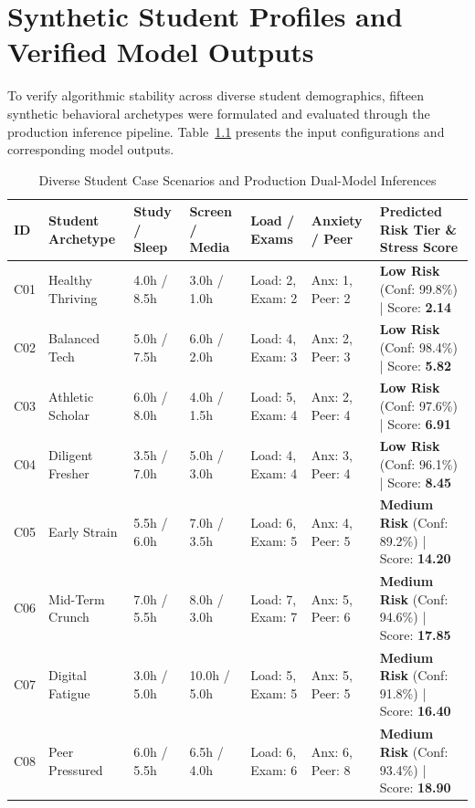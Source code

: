 \documentclass[12pt,a4paper,oneside]{report}
\begin{document}
\clearpage

\chapter{Synthetic Student Profiles and Verified Model Outputs}
\label{app:synthetic_cases}

To verify algorithmic stability across diverse student demographics, fifteen synthetic behavioral archetypes were formulated and evaluated through the production inference pipeline. Table~\ref{tab:synthetic_cases} presents the input configurations and corresponding model outputs.

\begin{table}[H]
\centering
\caption{Diverse Student Case Scenarios and Production Dual-Model Inferences}
\label{tab:synthetic_cases}
\scriptsize
\begin{tabularx}{\textwidth}{p{0.6cm}p{1.8cm}p{1.4cm}p{1.6cm}p{1.8cm}p{1.8cm}X}
\toprule
\textbf{ID} & \textbf{Student Archetype} & \textbf{Study / Sleep} & \textbf{Screen / Media} & \textbf{Load / Exams} & \textbf{Anxiety / Peer} & \textbf{Predicted Risk Tier \& Stress Score} \\
\midrule
C01 & Healthy Thriving & 4.0h / 8.5h & 3.0h / 1.0h & Load: 2, Exam: 2 & Anx: 1, Peer: 2 & \textbf{Low Risk} (Conf: 99.8\%) | Score: \textbf{2.14} \\
C02 & Balanced Tech & 5.0h / 7.5h & 6.0h / 2.0h & Load: 4, Exam: 3 & Anx: 2, Peer: 3 & \textbf{Low Risk} (Conf: 98.4\%) | Score: \textbf{5.82} \\
C03 & Athletic Scholar & 6.0h / 8.0h & 4.0h / 1.5h & Load: 5, Exam: 4 & Anx: 2, Peer: 4 & \textbf{Low Risk} (Conf: 97.6\%) | Score: \textbf{6.91} \\
C04 & Diligent Fresher & 3.5h / 7.0h & 5.0h / 3.0h & Load: 4, Exam: 4 & Anx: 3, Peer: 4 & \textbf{Low Risk} (Conf: 96.1\%) | Score: \textbf{8.45} \\
C05 & Early Strain & 5.5h / 6.0h & 7.0h / 3.5h & Load: 6, Exam: 5 & Anx: 4, Peer: 5 & \textbf{Medium Risk} (Conf: 89.2\%) | Score: \textbf{14.20} \\
C06 & Mid-Term Crunch & 7.0h / 5.5h & 8.0h / 3.0h & Load: 7, Exam: 7 & Anx: 5, Peer: 6 & \textbf{Medium Risk} (Conf: 94.6\%) | Score: \textbf{17.85} \\
C07 & Digital Fatigue & 3.0h / 5.0h & 10.0h / 5.0h & Load: 5, Exam: 5 & Anx: 5, Peer: 5 & \textbf{Medium Risk} (Conf: 91.8\%) | Score: \textbf{16.40} \\
C08 & Peer Pressured & 6.0h / 5.5h & 6.5h / 4.0h & Load: 6, Exam: 6 & Anx: 6, Peer: 8 & \textbf{Medium Risk} (Conf: 93.4\%) | Score: \textbf{18.90} \\

\end{tabularx}
\end{table}
\end{document}
